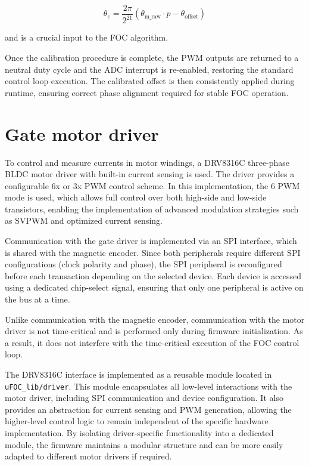 \begin{equation}
    \theta_e = \frac{2\pi}{2^{21}} \left( \theta_{\text{m\_raw}} \cdot p - \theta_{\text{offset}} \right)
\end{equation}


and is a crucial input to the FOC algorithm.

Once the calibration procedure is complete, the PWM outputs are returned to a neutral duty cycle and the ADC interrupt is re-enabled, restoring the standard control loop execution.
The calibrated offset is then consistently applied during runtime, ensuring correct phase alignment required for stable FOC operation.

\section{Gate motor driver}
To control and measure currents in motor windings, a DRV8316C three-phase BLDC motor driver with built-in current sensing is used.
The driver provides a configurable 6x or 3x PWM control scheme. 
In this implementation, the 6 PWM mode is used, which allows full control over both high-side and low-side transistors, 
enabling the implementation of advanced modulation strategies such as SVPWM and optimized current sensing.~\cite{datasheet_DRV8316C}

Communication with the gate driver is implemented via an SPI interface, which is shared with the magnetic encoder.
Since both peripherals require different SPI configurations (clock polarity and phase), 
the SPI peripheral is reconfigured before each transaction depending on the selected device. 
Each device is accessed using a dedicated chip-select signal, ensuring that only one peripheral is active on the bus at a time.

Unlike communication with the magnetic encoder, communication with the motor driver is not time-critical
and is performed only during firmware initialization. As a result, it does not interfere with the time-critical execution of the FOC control loop.

The DRV8316C interface is implemented as a reusable module located in \texttt{uFOC\_lib/driver}. 
This module encapsulates all low-level interactions with the motor driver, including SPI communication and device configuration. 
It also provides an abstraction for current sensing and PWM generation,
allowing the higher-level control logic to remain independent of the specific hardware implementation. 
By isolating driver-specific functionality into a dedicated module, the firmware maintains a modular structure
and can be more easily adapted to different motor drivers if required.


